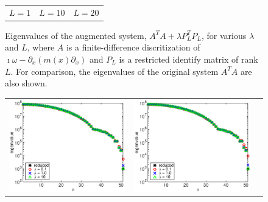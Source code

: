 \documentclass{iopart}
\begin{document}
\begin{figure}
\begin{tabular}{ccc}
{\small $L = 1$}&{\small $L = 10$}&{\small $L = 20$}\\
\end{tabular}
\caption{Eigenvalues of the augmented system,  $A^T\!A + \lambda P_L^T\!P_L$, for various $\lambda$ and $L$, where $A$ is a finite-difference discritization of $\imath\omega - \partial_x\left(m(x)\partial_x\right)$
and $P_L$ is a restricted identify matrix of rank $L$. For comparison, the eigenvalues of the original system $A^T\!A$ are also shown.}
\label{fig:example2}
\end{figure}

\begin{figure}
\centering
\begin{tabular}{ccc}
\includegraphics[scale=.2]{./figs/example3_a}&
\includegraphics[scale=.2]{./figs/example3_b}&

\end{tabular}
\end{figure}
\end{document}
